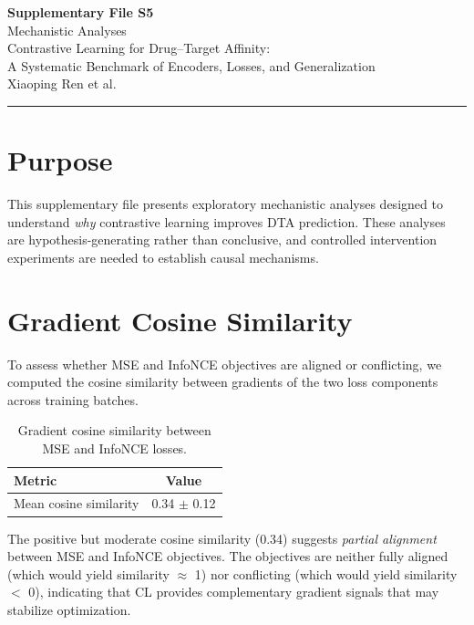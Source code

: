 \documentclass[10pt,a4paper]{article}
\begin{document}
\begin{center}
{\Large\bfseries Supplementary File S5}\\[0.5em]
{\large Mechanistic Analyses}\\[1em]
Contrastive Learning for Drug--Target Affinity:\\A Systematic Benchmark of Encoders, Losses, and Generalization\\[0.5em]
Xiaoping Ren et al.
\end{center}

\noindent\rule{\linewidth}{1pt}
\vspace{1em}

\section{Purpose}

This supplementary file presents exploratory mechanistic analyses designed to understand \textit{why} contrastive learning improves DTA prediction. These analyses are hypothesis-generating rather than conclusive, and controlled intervention experiments are needed to establish causal mechanisms.

\section{Gradient Cosine Similarity}

To assess whether MSE and InfoNCE objectives are aligned or conflicting, we computed the cosine similarity between gradients of the two loss components across training batches.

\begin{table}[!h]
\caption{Gradient cosine similarity between MSE and InfoNCE losses.}
\label{tab:gradient_similarity}
\centering
\begin{tabular}{lc}
\toprule
Metric & Value \\
\midrule
Mean cosine similarity & 0.34 $\pm$ 0.12 \\
\bottomrule
\end{tabular}
\end{table}

The positive but moderate cosine similarity (0.34) suggests \textit{partial alignment} between MSE and InfoNCE objectives. The objectives are neither fully aligned (which would yield similarity $\approx$ 1) nor conflicting (which would yield similarity $<$ 0), indicating that CL provides complementary gradient signals that may stabilize optimization.
\end{document}
